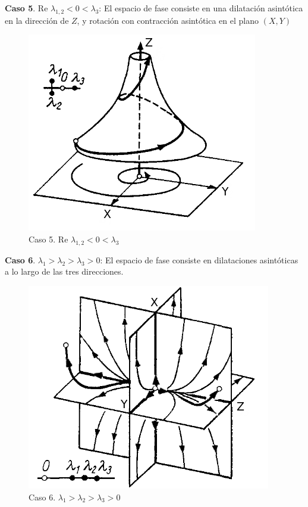 \documentclass[a4paper,10pt]{article}
\numberwithin{equation}{section}
\begin{document}
\textbf{Caso 5}. Re $\lambda_{1,2} < 0 < \lambda_3$: El espacio de fase consiste en una dilatación asintótica
en la dirección de $Z$, y rotación con contracción asintótica en el plano $(X,Y)$

\begin{figure}[H]
 \centering
\includegraphics[scale=0.35]{problema3fig6}
\caption{Caso 5. Re $\lambda_{1,2} < 0 < \lambda_3$}
\label{fig:problema3fig6}
\end{figure}
\vspace{.3cm}

\textbf{Caso 6}. $\lambda_1 > \lambda_2 > \lambda_3 > 0$: El espacio de fase consiste en dilataciones asintóticas
a lo largo de las tres direcciones.

\begin{figure}[h]
 \centering
\includegraphics[scale=0.35]{problema3fig7}
\caption{Caso 6. $\lambda_1 > \lambda_2 > \lambda_3 > 0$}
\label{fig:problema3fig7}
\end{figure}
\vspace{.3cm}
\end{document}
